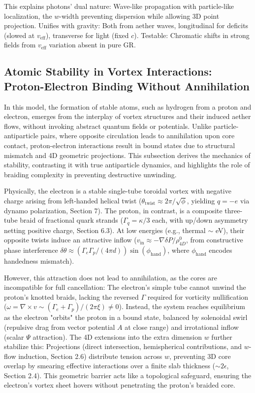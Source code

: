 \documentclass{article}
\begin{document}
This explains photons' dual nature: Wave-like propagation with particle-like localization, the $w$-width preventing dispersion while allowing 3D point projection. Unifies with gravity: Both from aether waves, longitudinal for deficits (slowed at $v_{\text{eff}}$), transverse for light (fixed $c$). Testable: Chromatic shifts in strong fields from $v_{\text{eff}}$ variation absent in pure GR.

\subsection{Atomic Stability in Vortex Interactions: Proton-Electron Binding Without Annihilation}

In this model, the formation of stable atoms, such as hydrogen from a proton and electron, emerges from the interplay of vortex structures and their induced aether flows, without invoking abstract quantum fields or potentials. Unlike particle-antiparticle pairs, where opposite circulation leads to annihilation upon core contact, proton-electron interactions result in bound states due to structural mismatch and 4D geometric projections. This subsection derives the mechanics of stability, contrasting it with true antiparticle dynamics, and highlights the role of braiding complexity in preventing destructive unwinding.

Physically, the electron is a stable single-tube toroidal vortex with negative charge arising from left-handed helical twist ($\theta_{\text{twist}} \approx 2\pi / \sqrt{\phi}$, yielding $q = -e$ via dynamo polarization, Section 7). The proton, in contrast, is a composite three-tube braid of fractional quark strands ($\Gamma_q = \kappa / 3$ each, with up/down asymmetry netting positive charge, Section 6.3). At low energies (e.g., thermal $\sim$ eV), their opposite twists induce an attractive inflow ($v_{\text{in}} \approx - \nabla \delta P / \rho_{4D}^0$, from constructive phase interference $\delta \theta \approx (\Gamma_e \Gamma_p / (4\pi d)) \sin(\phi_{\text{hand}})$, where $\phi_{\text{hand}}$ encodes handedness mismatch).

However, this attraction does not lead to annihilation, as the cores are incompatible for full cancellation: The electron's simple tube cannot unwind the proton's knotted braids, lacking the reversed $\Gamma$ required for vorticity nullification ($\omega = \nabla \times v \sim (\Gamma_e + \Gamma_p) / (2\pi \xi) \neq 0$). Instead, the system reaches equilibrium as the electron "orbits" the proton in a bound state, balanced by solenoidal swirl (repulsive drag from vector potential $A$ at close range) and irrotational inflow (scalar $\Psi$ attraction). The 4D extensions into the extra dimension $w$ further stabilize this: Projections (direct intersection, hemispherical contributions, and $w$-flow induction, Section 2.6) distribute tension across $w$, preventing 3D core overlap by smearing effective interactions over a finite slab thickness ($\sim 2\epsilon$, Section 2.4). This geometric barrier acts like a topological safeguard, ensuring the electron's vortex sheet hovers without penetrating the proton's braided core.
\end{document}
